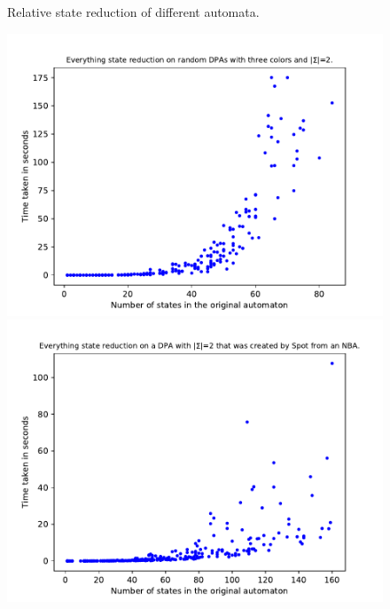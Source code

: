 \begin{figure}
\begin{minipage}{0.49\textwidth}
		\caption{Relative state reduction of different automata.}
		\label{fig:everything:empirical_reduct_rel}
	\end{minipage}
\end{figure}


\begin{figure}
	\centering
	\begin{minipage}{0.49\textwidth}
		\includegraphics[page=1,height=.3\textheight]{../data/analysis/everything/gendet_ap1.pdf} 
		\includegraphics[page=1,height=.3\textheight]{../data/analysis/everything/detspot_ap1.pdf} 

\end{minipage}
\end{figure}
